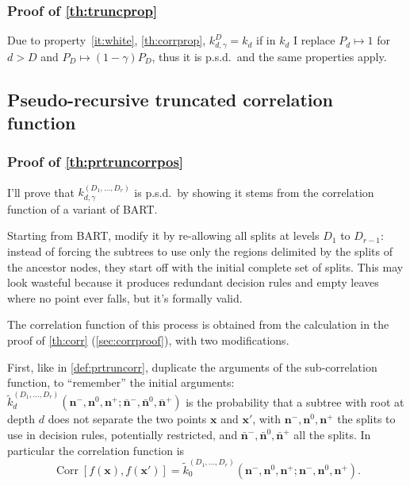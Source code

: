\documentclass[a4paper]{article}
\newcommand{\nvecs}{\mathbf n^-, \mathbf n^0, \mathbf n^+}
\newcommand{\barnvecs}{\bar{\mathbf n}^-, \bar{\mathbf n}^0, \bar{\mathbf n}^+}
\theoremstyle{definition}
\begin{document}
    \subsubsection{Proof of \autoref{th:truncprop}}
    \label{sec:truncpropproof}

    Due to property~\ref{it:white}, \autoref{th:corrprop}, $k^D_{d,\gamma}=k_d$ if in $k_d$ I replace $P_d \mapsto 1$ for $d > D$ and $P_D \mapsto (1 - \gamma) P_D$, thus it is p.s.d.\ and the same properties apply.

    \subsection{Pseudo-recursive truncated correlation function}
    \label{sec:ptruncproof}
        
    \subsubsection{Proof of \autoref{th:prtruncorrpos}}
    \label{sec:prtruncorrposproof}

    I'll prove that $k^{(D_1,\ldots,D_r)}_{d,\gamma}$ is p.s.d.\ by showing it stems from the correlation function of a variant of BART.

    Starting from BART, modify it by re-allowing all splits at levels $D_1$ to $D_{r-1}$: instead of forcing the subtrees to use only the regions delimited by the splits of the ancestor nodes, they start off with the initial complete set of splits. This may look wasteful because it produces redundant decision rules and empty leaves where no point ever falls, but it's formally valid.

    The correlation function of this process is obtained from the calculation in the proof of \autoref{th:corr} (\autoref{sec:corrproof}), with two modifications.

    First, like in \autoref{def:prtruncorr}, duplicate the arguments of the sub-correlation function, to ``remember'' the initial arguments: $\tilde k^{(D_1,\ldots,D_r)}_d(\nvecs;\barnvecs)$ is the probability that a subtree with root at depth $d$ does not separate the two points $\mathbf x$ and $\mathbf x'$, with $\nvecs$ the splits to use in decision rules, potentially restricted, and $\barnvecs$ all the splits. In particular the correlation function is
    \begin{equation}
        \operatorname{Corr}[f(\mathbf x), f(\mathbf x')] = \tilde k^{(D_1,\ldots,D_r)}_0(\nvecs;\nvecs).
    \end{equation}
    
\end{document}
